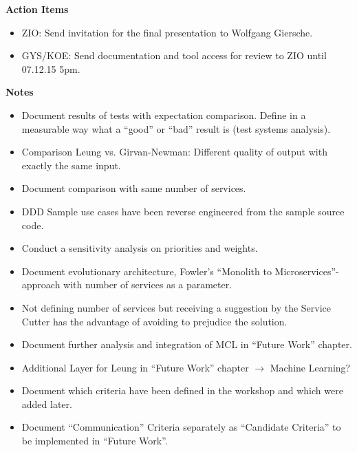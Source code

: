\textbf{Action Items}

\begin{itemize}
\item ZIO: Send invitation for the final presentation to Wolfgang Giersche.
\item GYS/KOE: Send documentation and tool access for review to ZIO until 07.12.15 5pm.
\end{itemize}

\textbf{Notes }
\begin{itemize}
\item Document results of tests with expectation comparison. Define in a measurable way what a \enquote{good} or \enquote{bad} result is (test systems analysis).
\item Comparison Leung vs. Girvan-Newman: Different quality of output with exactly the same input. 
\item Document comparison with same number of services.
\item DDD Sample use cases have been reverse engineered from the sample source code.
\item Conduct a sensitivity analysis on priorities and weights.
\item Document evolutionary architecture, Fowler's \enquote{Monolith to Microservices}-approach with number of services as a parameter. 
\item Not defining number of services but receiving a suggestion by the Service Cutter has the advantage of avoiding to prejudice the solution.  
\item Document further analysis and integration of MCL in \enquote{Future Work} chapter.
\item Additional Layer for Leung in \enquote{Future Work} chapter $\rightarrow$ Machine Learning?
\item Document which criteria have been defined in the workshop and which were added later.  
\item Document \enquote{Communication} Criteria separately as \enquote{Candidate Criteria} to be implemented in \enquote{Future Work}.
\end{itemize}

